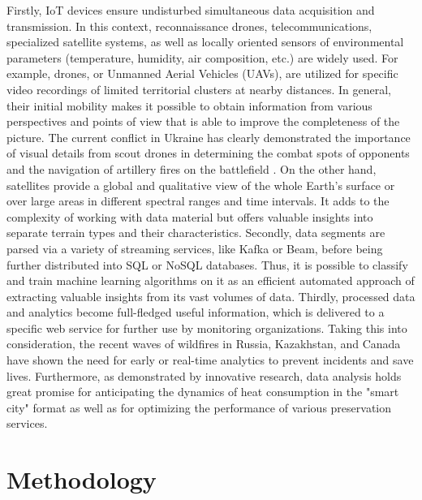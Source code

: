 \documentclass[3p,times,procedia]{elsarticle}
\begin{document}
Firstly, IoT devices ensure undisturbed simultaneous data acquisition and transmission. In this context, reconnaissance drones, telecommunications, specialized satellite systems, as well as locally oriented sensors of environmental parameters (temperature, humidity, air composition, etc.) are widely used. For example, drones, or Unmanned Aerial Vehicles (UAVs), are utilized for specific video recordings of limited territorial clusters at nearby distances. In general, their initial mobility makes it possible to obtain information from various perspectives and points of view that is able to improve the completeness of the picture. The current conflict in Ukraine has clearly demonstrated the importance of visual details from scout drones in determining the combat spots of opponents and the navigation of artillery fires on the battlefield \cite{Kunertova2022}. On the other hand, satellites provide a global and qualitative view of the whole Earth’s surface or over large areas in different spectral ranges and time intervals. It adds to the complexity of working with data material but offers valuable insights into separate terrain types and their characteristics. Secondly, data segments are parsed via a variety of streaming services, like Kafka or Beam, before being further distributed into SQL or NoSQL databases. Thus, it is possible to classify and train machine learning algorithms on it as an efficient automated approach of extracting valuable insights from its vast volumes of data. Thirdly, processed data and analytics become full-fledged useful information, which is delivered to a specific web service for further use by monitoring organizations. Taking this into consideration, the recent waves of wildfires in Russia, Kazakhstan, and Canada have shown the need for early or real-time analytics to prevent incidents and save lives. Furthermore, as demonstrated by innovative research, data analysis holds great promise for anticipating the dynamics of heat consumption in the "smart city" format as well as for optimizing the performance of various preservation services\cite{Omirgaliyev2022}.
\section{Methodology}
\end{document}
